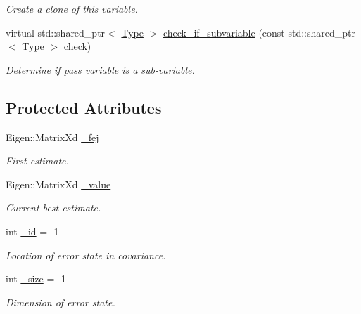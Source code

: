 \begin{DoxyCompactItemize}
\begin{DoxyCompactList}\small\item\em Create a clone of this variable. \end{DoxyCompactList}\item 
virtual std\+::shared\+\_\+ptr$<$ \hyperlink{classov__type_1_1Type}{Type} $>$ \hyperlink{classov__type_1_1Type_a95fcdbc584256baffc78935de5ab5da3}{check\+\_\+if\+\_\+subvariable} (const std\+::shared\+\_\+ptr$<$ \hyperlink{classov__type_1_1Type}{Type} $>$ check)
\begin{DoxyCompactList}\small\item\em Determine if pass variable is a sub-\/variable. \end{DoxyCompactList}\end{DoxyCompactItemize}
\subsection*{Protected Attributes}
\begin{DoxyCompactItemize}
\item 
\mbox{\label{classov__type_1_1Type_a9e035fed9c1dc0e975f7e41c2a95695f}} 
Eigen\+::\+Matrix\+Xd \hyperlink{classov__type_1_1Type_a9e035fed9c1dc0e975f7e41c2a95695f}{\+\_\+fej}
\begin{DoxyCompactList}\small\item\em First-\/estimate. \end{DoxyCompactList}\item 
\mbox{\label{classov__type_1_1Type_a40afb4c94c3d11db860b98c186e22312}} 
Eigen\+::\+Matrix\+Xd \hyperlink{classov__type_1_1Type_a40afb4c94c3d11db860b98c186e22312}{\+\_\+value}
\begin{DoxyCompactList}\small\item\em Current best estimate. \end{DoxyCompactList}\item 
\mbox{\label{classov__type_1_1Type_adb644d3f30691886f153527a9782a1e0}} 
int \hyperlink{classov__type_1_1Type_adb644d3f30691886f153527a9782a1e0}{\+\_\+id} = -\/1
\begin{DoxyCompactList}\small\item\em Location of error state in covariance. \end{DoxyCompactList}\item 
\mbox{\label{classov__type_1_1Type_ae7450adb49403a591013e1719ab1e46e}} 
int \hyperlink{classov__type_1_1Type_ae7450adb49403a591013e1719ab1e46e}{\+\_\+size} = -\/1
\begin{DoxyCompactList}\small\item\em Dimension of error state. \end{DoxyCompactList}\end{DoxyCompactItemize}


